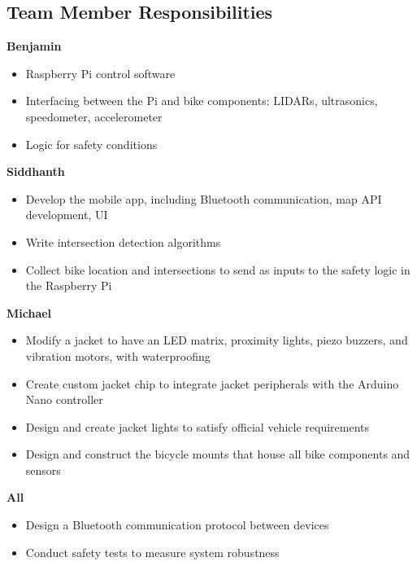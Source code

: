 \documentclass[journal]{IEEEtran}
\begin{document}
\subsection{Team Member Responsibilities}
\textbf{Benjamin}
\begin{itemize}
    \item Raspberry Pi control software
    \item Interfacing between the Pi and bike components: LIDARs, ultrasonics, speedometer, accelerometer
    \item Logic for safety conditions
\end{itemize}

\textbf{Siddhanth}
\begin{itemize}
    \item Develop the mobile app, including Bluetooth communication, map API development, UI
    \item Write intersection detection algorithms
    \item Collect bike location and intersections to send as inputs to the safety logic in the Raspberry Pi
\end{itemize}

\textbf{Michael}
\begin{itemize}
    \item Modify a jacket to have an LED matrix, proximity lights, piezo buzzers, and vibration motors, with waterproofing
    \item Create custom jacket chip to integrate jacket peripherals with the Arduino Nano controller
    \item Design and create jacket lights to satisfy official vehicle
requirements
    \item Design and construct the bicycle mounts that house all bike components and sensors
\end{itemize}

\textbf{All}
\begin{itemize}
    \item Design a Bluetooth communication protocol between devices
    \item Conduct safety tests to measure system robustness
\end{itemize}
\end{document}
